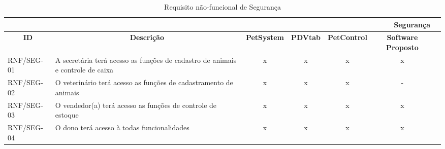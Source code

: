 \documentclass[12pt,openright,twoside,a4paper,english,french,spanish,brazil]{abntex2}
\begin{document}
\begin{landscape}
\begin{table}[!htpb]
\centering
\caption{Requisito não-funcional de Segurança}\label{tab:RNF_SEG}
\begin{small} 
\setlength{\tabcolsep}{3pt}
\begin{tabular}{|p{3cm}|p{}|c|c|c|cc|}
    \toprule
    \multicolumn{6}{r}{\textbf{Segurança}} \\
    \midrule
    \multicolumn{1}{c}{\textbf{ID}} & \multicolumn{1}{c}{\textbf{Descrição}} & \multicolumn{1}{c}{\textbf{PetSystem}} & \multicolumn{1}{c}{\textbf{PDVtab}} & \multicolumn{1}{c}{\textbf{PetControl}} & \multicolumn{1}{c}{\textbf{Software Proposto}} \\
    RNF/SEG-01 & A secretária terá acesso as funções de cadastro de animais e controle de caixa & x & x & x & x \\
    RNF/SEG-02 & O veterinário terá acesso as funções de cadastramento de animais & x & x & x & - \\
    RNF/SEG-03 & O vendedor(a) terá acesso as funções de controle de estoque & x & x & x & x \\
    RNF/SEG-04 & O dono terá acesso à todas funcionalidades & x & x & x & x \\
    \bottomrule
 \end{tabular}%
\end{small}
\end{table}


\end{landscape}
\end{document}
